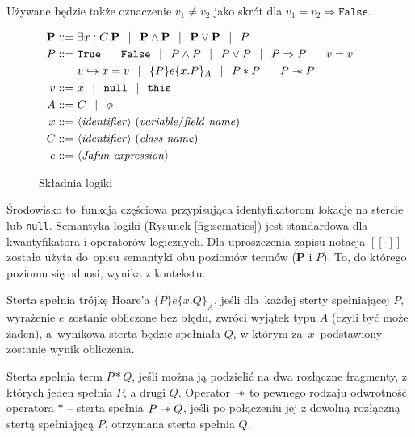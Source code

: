 \documentclass[]{pracamgr}
\newcommand \wand {\mathrel{-\mkern-6mu*}}
\newcommand \outerP {\mathbf{P}}
\newcommand \hoare [5] {\{#1\}#2\{#4.#5\}_#3}
\renewcommand \| {\hspace{0.75em} | \hspace{0.75em} }
\renewcommand \[ {[\![}
\renewcommand \] {]\!]}
\theoremstyle{definition}
\begin{document}
Używane będzie także oznaczenie $v_1 \neq v_2$ jako skrót dla $v_1 = v_2 \Rightarrow \mathtt{False}$.

\begin{figure}[h]
\begin{align*}
 \outerP ::= & \ \exists x : C.\outerP \| \outerP \wedge \outerP \| \outerP \vee \outerP \| P \\
 P ::= & \ \mathtt{True} \| \mathtt{False} \| P \wedge P \| P \vee P \| P \Rightarrow P \| v = v \| \\
     & \  v \hookrightarrow x = v \| \hoare{P}{e}{A}{x}{P} \|  P * P \| P \wand P \\
 v ::= & \  x \| \mathtt{null} \| \mathtt{this} \\
 A ::= & \ C \| \phi \\
 x ::= & \ \langle\mathit{identifier}\rangle \ (\mathit{variable / field\ name}) \\
 C ::= & \ \langle\mathit{identifier}\rangle \ (\mathit{class\ name}) \\
 e ::= & \ \langle \mathit{Jafun\ expression} \rangle
\end{align*}
\caption{Składnia logiki}
\label{fig:syntax}
\end{figure}

Środowisko to~funkcja częściowa przypisująca identyfikatorom lokacje na stercie lub \texttt{null}.
Semantyka logiki (Rysunek \ref{fig:sematics}) jest standardowa dla kwantyfikatora i operatorów logicznych.
Dla uproszczenia zapisu notacja $\[ \cdot \]$ została użyta do~opisu semantyki obu poziomów termów
($\outerP$ i $P$). To, do którego poziomu się odnosi, wynika z kontekstu.

Sterta spełnia trójkę Hoare'a $\hoare{P}{e}{A}{x}{Q}$, jeśli dla~każdej sterty spełniającej
$P$, wyrażenie $e$ zostanie obliczone bez błędu, zwróci wyjątek typu $A$ (czyli być może żaden),
a~wynikowa sterta będzie
spełniała $Q$, w którym za~$x$~podstawiony zostanie wynik obliczenia.

Sterta spełnia term $P * Q$, jeśli można ją podzielić na dwa rozłączne fragmenty, z których
jeden spełnia $P$, a drugi $Q$.
Operator $\wand$ to pewnego rodzaju odwrotność operatora $*$ -- sterta spełnia $P \wand Q$, jeśli
po połączeniu jej z dowolną rozłączną stertą spełniającą $P$, otrzymana sterta spełnia $Q$.
\end{document}
